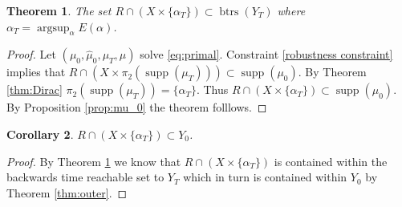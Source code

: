 \documentclass[12pt]{amsart}
\DeclareMathOperator{\vol}{vol}
\DeclareMathOperator{\supp}{supp}
\DeclareMathOperator{\btrs}{btrs}
\newtheorem{thm}{Theorem}[section]
\newtheorem{cor}[thm]{Corollary}
\begin{document}
%
%
\begin{thm} \label{thm:robustness}
	The set $R \cap ( X \times \{ \alpha_T \}) \subset \btrs(Y_T)$ where $\alpha_T = \operatorname{argsup}_\alpha E(\alpha)$.
\end{thm}
\begin{proof}
	Let $(\mu_0,\hat{\mu}_0,\mu_T,\mu)$ solve \eqref{eq:primal}.  Constraint \eqref{robustness constraint} implies that $R \cap (X \times \pi_2(\supp(\mu_T)) ) \subset \supp(\mu_0)$.
	By Theorem \ref{thm:Dirac} $\pi_2( \supp(\mu_T) ) = \{ \alpha_T \}$.	Thus $R \cap (X \times \{\alpha_T\} ) \subset \supp(\mu_0)$.
	By Proposition \ref{prop:mu_0} the theorem folllows.
\end{proof}

\begin{cor}
	$R \cap(X \times \{\alpha_T \}) \subset Y_0$.
\end{cor}
\begin{proof}
	By Theorem \ref{thm:robustness} we know that $R \cap(X \times \{\alpha_T \})$ is contained within the backwards time reachable set to $Y_T$
	which in turn is contained within $Y_0$ by Theorem \ref{thm:outer}.
\end{proof}
\end{document}
